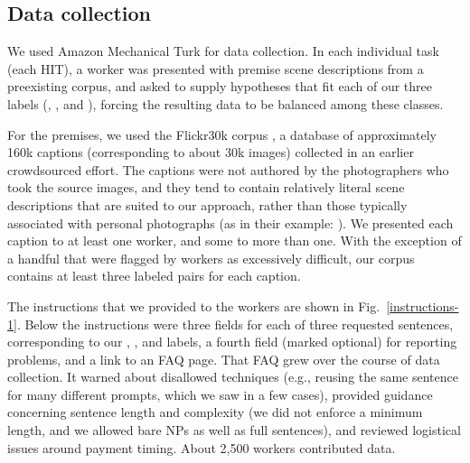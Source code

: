 
\subsection{Data collection}

We used Amazon Mechanical Turk for data collection. In each individual task (each HIT), a worker was presented with premise scene descriptions from a preexisting corpus, and asked to supply hypotheses that fit each of our three labels (, , and ), forcing the resulting data to be balanced among these classes.

For the premises, we used the Flickr30k corpus \cite{hodoshimage}, a database of approximately 160k captions  (corresponding to about 30k images) collected in an earlier crowdsourced effort. The captions were not authored by the photographers who took the source images, and they tend to contain relatively literal scene descriptions that are suited to our approach, rather than those typically associated with personal photographs (as in their example: ). We presented each caption to at least one worker, and some to more than one. With the exception of a handful that were flagged by workers as excessively difficult, our corpus contains at least three labeled pairs for each caption.

\noindent{}

The instructions that we provided to the workers are shown in Fig.~\ref{instructions-1}. Below the instructions were three fields for each of three requested sentences, corresponding to our , , and  labels, a fourth field (marked optional) for reporting problems, and a link to an FAQ page. That FAQ grew over the course of data collection. It warned about disallowed techniques (e.g., reusing the same sentence for many different prompts, which we saw in a few cases), provided guidance concerning sentence length and complexity (we did not enforce a minimum length, and we allowed bare NPs as well as full sentences), and reviewed logistical issues around payment timing. About 2,500 workers contributed data.

